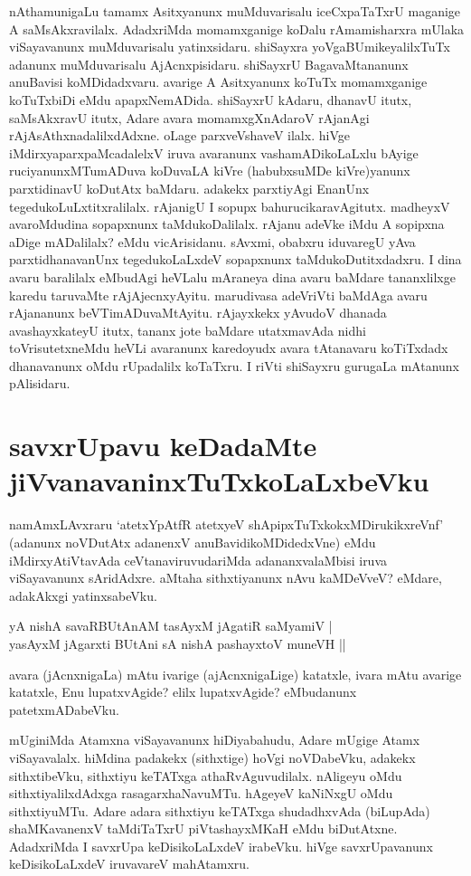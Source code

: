 nAthamunigaLu tamamx Asitxyanunx muMduvarisalu iceCxpaTaTxrU maganige A saMsAkxravilalx. AdadxriMda momamxganige koDalu rAmamisharxra mUlaka viSayavanunx muMduvarisalu yatinxsidaru. shiSayxra yoVgaBUmikeyalilxTuTx adanunx muMduvarisalu AjAcnxpisidaru. shiSayxrU BagavaMtananunx anuBavisi koMDidadxvaru. avarige A Asitxyanunx koTuTx momamxganige koTuTxbiDi eMdu apapxNemADida. shiSayxrU kAdaru, dhanavU itutx, saMsAkxravU itutx, Adare avara momamxgXnAdaroV rAjanAgi rAjAsAthxnadalilxdAdxne. oLage parxveVshaveV ilalx. hiVge iMdirxyaparxpaMcadalelxV iruva avaranunx vashamADikoLaLxlu bAyige ruciyanunxMTumADuva koDuvaLA kiVre (habubxsuMDe kiVre)yanunx parxtidinavU koDutAtx baMdaru. adakekx parxtiyAgi EnanUnx tegedukoLuLxtitxralilalx. rAjanigU I sopupx bahurucikaravAgitutx. madheyxV avaroMdudina sopapxnunx taMdukoDalilalx. rAjanu adeVke iMdu A sopipxna aDige mADalilalx? eMdu vicArisidanu. sAvxmi, obabxru iduvaregU yAva parxtidhanavanUnx tegedukoLaLxdeV sopapxnunx taMdukoDutitxdadxru. I dina avaru baralilalx eMbudAgi heVLalu mAraneya dina avaru baMdare tananxlilxge karedu taruvaMte rAjAjecnxyAyitu. marudivasa adeVriVti baMdAga avaru rAjananunx beVTimADuvaMtAyitu. rAjayxkekx  yAvudoV dhanada avashayxkateyU itutx, tananx jote baMdare utatxmavAda nidhi toVrisutetxneMdu heVLi avaranunx karedoyudx avara tAtanavaru koTiTxdadx dhanavanunx oMdu rUpadalilx koTaTxru. I riVti shiSayxru gurugaLa mAtanunx pAlisidaru.

\section*{savxrUpavu keDadaMte jiVvanavaninxTuTxkoLaLxbeVku}

namAmxLAvxraru `atetxYpAtfR atetxyeV shApipxTuTxkokxMDirukikxreVnf' (adanunx noVDutAtx adanenxV anuBavidikoMDidedxVne) eMdu iMdirxyAtiVtavAda ceVtanaviruvudariMda adananxvalaMbisi iruva viSayavanunx sAridAdxre. aMtaha sithxtiyanunx nAvu kaMDeVveV? eMdare, adakAkxgi yatinxsabeVku.

\begin{shloka}
yA nishA savaRBUtAnAM tasAyxM jAgatiR saMyamiV |\label{138a}\\
yasAyxM jAgarxti BUtAni sA nishA pashayxtoV muneVH ||
\end{shloka}

avara (jAcnxnigaLa) mAtu ivarige (ajAcnxnigaLige) katatxle, ivara mAtu avarige katatxle, Enu lupatxvAgide? elilx lupatxvAgide? eMbudanunx patetxmADabeVku.

mUginiMda Atamxna viSayavanunx hiDiyabahudu, Adare mUgige Atamx viSayavalalx. hiMdina padakekx (sithxtige) hoVgi noVDabeVku, adakekx sithxtibeVku, sithxtiyu keTATxga athaRvAguvudilalx. nAligeyu oMdu sithxtiyalilxdAdxga rasagarxhaNavuMTu. hAgeyeV kaNiNxgU oMdu sithxtiyuMTu. Adare adara sithxtiyu keTATxga shudadhxvAda (biLupAda) shaMKavanenxV taMdiTaTxrU piVtashayxMKaH eMdu biDutAtxne. AdadxriMda I savxrUpa keDisikoLaLxdeV irabeVku. hiVge savxrUpavanunx keDisikoLaLxdeV iruvavareV mahAtamxru.

